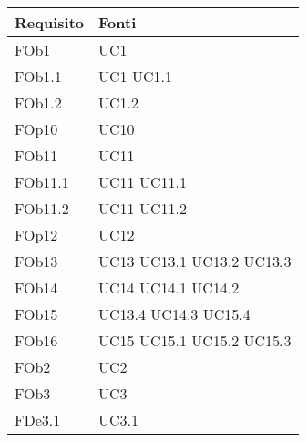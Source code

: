 \begin{longtable}{|l|p{4cm}|}
\hline
\textbf{Requisito} & \textbf{Fonti} \\
\hline
FOb1 & UC1 \linebreak \\ 
\hline
FOb1.1 & UC1 \linebreak  UC1.1 \linebreak  \\ 
\hline
FOb1.2 & UC1.2 \linebreak  \\ 
\hline
FOp10 & UC10 \linebreak \\ 
\hline
FOb11 & UC11 \linebreak \\ 
\hline
FOb11.1 & UC11 \linebreak  UC11.1 \linebreak  \\ 
\hline
FOb11.2 & UC11 \linebreak  UC11.2 \linebreak  \\ 
\hline
FOp12 & UC12 \linebreak \\ 
\hline
FOb13 & UC13 \linebreak UC13.1 \linebreak UC13.2 \linebreak UC13.3 \linebreak \\ 
\hline
FOb14 & UC14 \linebreak UC14.1 \linebreak UC14.2 \linebreak \\ 
\hline
FOb15 & UC13.4 \linebreak UC14.3 \linebreak UC15.4 \linebreak \\ 
\hline
FOb16 & UC15 \linebreak UC15.1 \linebreak UC15.2 \linebreak UC15.3 \linebreak \\ 
\hline
FOb2 & UC2 \linebreak \\ 
\hline
FOb3 & UC3 \linebreak \\ 
\hline
FDe3.1 & UC3.1 \linebreak  \\ 

\end{longtable}
